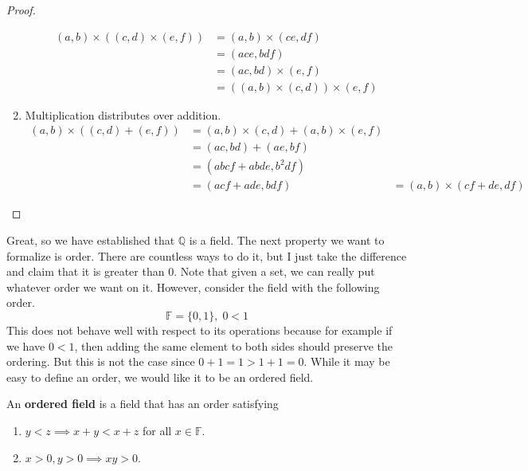 \begin{proof}
\begin{enumerate}
      \begin{align}
        (a, b) \times ((c, d) \times (e, f)) & = (a, b) \times (ce, df) \\ 
                                             & = (ace, bdf) \\
                                             & = (ac, bd) \times (e, f) \\
                                             & = ((a, b) \times (c, d)) \times (e, f)
      \end{align}
      \item Multiplication distributes over addition. 
        \begin{align}
          (a, b) \times ((c, d) + (e, f)) & = (a, b) \times (c, d) + (a, b) \times (e, f) \\
                                          & = (ac, bd) + (ae, bf) \\
                                          & = (abcf + abde, b^2 df) \\
                                          & = (acf + ade, bdf)  
                                          & = (a, b) \times (cf + de, df)
        \end{align}
    \end{enumerate}
  \end{proof}

  Great, so we have established that $\mathbb{Q}$ is a field. The next property we want to formalize is order. There are countless ways to do it, but I just take the difference and claim that it is greater than $0$. Note that given a set, we can really put whatever order we want on it. However, consider the field with the following order. 
  \begin{equation}
    \mathbb{F} = \{0, 1\}, \; 0 < 1
  \end{equation} 
  This does not behave well with respect to its operations because for example if we have $0 < 1$, then adding the same element to both sides should preserve the ordering. But this is not the case since $0 + 1 = 1 > 1 + 1 = 0$. While it may be easy to define an order, we would like it to be an ordered field. 

  \begin{definition}
    An \textbf{ordered field} is a field that has an order satisfying 
    \begin{enumerate}
      \item $y < z \implies x + y < x + z$ for all $x \in \mathbb{F}$. 
      \item $x > 0, y > 0 \implies xy > 0$. 
    \end{enumerate}
  \end{definition}


